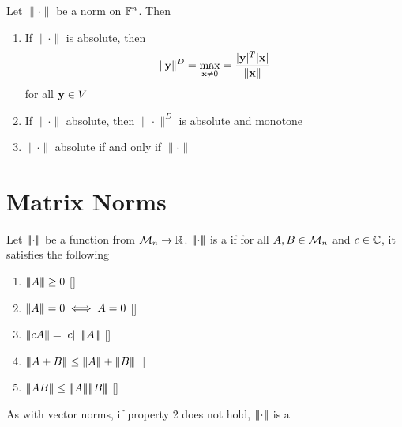 \documentclass[aspectratio=169]{beamer}
\begin{document}
\begin{frame}
\begin{theorem}
Let $\|\cdot\|$ be a norm on $\mathbb{F}^n$. Then
\begin{enumerate}
    \item If $\|\cdot\|$ is absolute, then 
    \[
        \|\mathbf{y}\|^D= \max\limits_{\mathbf{x}\neq 0}= \dfrac{|\mathbf{y}|^T |\mathbf{x}|}{\|\mathbf{x}\|}
    \]
    for all $\mathbf{y}\in V$
    \item If $\|\cdot\|$ absolute, then $\|\cdot\|^D$ is absolute and monotone
    \item $\|\cdot\|$ absolute if and only if $\|\cdot\|$
\end{enumerate}
\end{theorem}
\end{frame}

\section{Matrix Norms}
\label{sec:matrix_norms}


\begin{frame}
\begin{definition}
Let $\left|\!\left|\!\left|\cdot\right|\!\right|\!\right| $ be a function from $\mathcal{M}_n\to \mathbb{R}$. $\left|\!\left|\!\left|\cdot\right|\!\right|\!\right|$ is a  if for all $A,B\in \mathcal{M}_n$ and $c\in\mathbb{C}$, it satisfies the following
\begin{enumerate}
    \item $\left|\!\left|\!\left|A\right|\!\right|\!\right| \geq 0$ \hfill[]
    \item $\left|\!\left|\!\left|A\right|\!\right|\!\right|  =0 \iff A=0$ \hfill[]
    \item $\Nt{cA} = |c|\ \Nt{A}$ \hfill[]
    \item $\Nt{A+B} \leq \Nt{A}  +\tripbar B \tripbar$ \hfill[]
    \item $\tripbar AB \tripbar \leq \tripbar A\tripbar \tripbar B \tripbar$
    \hfill[]
\end{enumerate}
\end{definition}
\vfill
\begin{remark}
    As with vector norms, if property 2 does not hold, $\left|\!\left|\!\left|\cdot\right|\!\right|\!\right|$ is a 
\end{remark}
\end{frame} 
\end{document}
